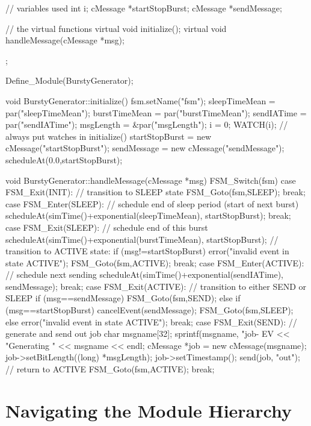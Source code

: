 \begin{ned}
\begin{cpp}
{    // variables used
    int i;
    cMessage *startStopBurst;
    cMessage *sendMessage;

    // the virtual functions
    virtual void initialize();
    virtual void handleMessage(cMessage *msg);
};

Define_Module(BurstyGenerator);

void BurstyGenerator::initialize()
{
    fsm.setName("fsm");
    sleepTimeMean = par("sleepTimeMean");
    burstTimeMean = par("burstTimeMean");
    sendIATime = par("sendIATime");
    msgLength = &par("msgLength");
    i = 0;
    WATCH(i); // always put watches in initialize()
    startStopBurst = new cMessage("startStopBurst");
    sendMessage = new cMessage("sendMessage");
    scheduleAt(0.0,startStopBurst);
}

void BurstyGenerator::handleMessage(cMessage *msg)
{
   FSM_Switch(fsm) {
     case FSM_Exit(INIT):
       // transition to SLEEP state
       FSM_Goto(fsm,SLEEP);
       break;
     case FSM_Enter(SLEEP):
       // schedule end of sleep period (start of next burst)
       scheduleAt(simTime()+exponential(sleepTimeMean), startStopBurst);
     break;
     case FSM_Exit(SLEEP):
       // schedule end of this burst
       scheduleAt(simTime()+exponential(burstTimeMean), startStopBurst);
       // transition to ACTIVE state:
       if (msg!=startStopBurst) {
         error("invalid event in state ACTIVE");
       }
       FSM_Goto(fsm,ACTIVE);
       break;
     case FSM_Enter(ACTIVE):
       // schedule next sending
       scheduleAt(simTime()+exponential(sendIATime), sendMessage);
     break;
     case FSM_Exit(ACTIVE):
       // transition to either SEND or SLEEP
       if (msg==sendMessage) {
         FSM_Goto(fsm,SEND);
       } else if (msg==startStopBurst) {
         cancelEvent(sendMessage);
         FSM_Goto(fsm,SLEEP);
       } else {
         error("invalid event in state ACTIVE");
       }
       break;
     case FSM_Exit(SEND): {
       // generate and send out job
       char msgname[32];
       sprintf(msgname, "job-%
       EV << "Generating " << msgname << endl;
       cMessage *job = new cMessage(msgname);
       job->setBitLength((long) *msgLength);
       job->setTimestamp();
       send(job, "out");
       // return to ACTIVE
       FSM_Goto(fsm,ACTIVE);
       break;
     }
   }
}
\end{cpp}




\section{Navigating the Module Hierarchy}
\label{sec:simple-modules:walking-module-hierarchy}


\end{ned}
